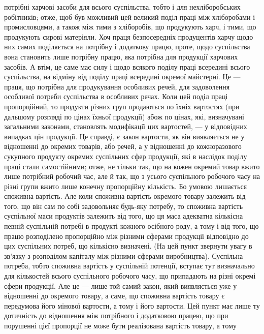 \parcont{}  %
потрібні харчові засоби для всього суспільства, тобто і для нехліборобських робітників;
отже, щоб був можливий цей великий поділ праці між хліборобами
і промисловцями, а також між тими з хліборобів, що продукують харч, і тими,
що продукують сирові матеріяли. Хоч праця безпосередніх продуцентів харчу
щодо них самих поділяється на потрібну і додаткову працю, проте, щодо
суспільства вона становить лише потрібну працю, яка потрібна для продукції
харчових засобів. А втім, це саме має силу і щодо всякого поділу праці
всередині всього суспільства, на відміну від поділу праці всередині окремої майстерні.
Це — праця, що потрібна для продукування особливих речей, для задоволення
особливої потреби суспільства в особливих речах. Коли цей поділ праці
пропорційний, то продукти різних груп продаються по їхніх вартостях (при
дальшому розгляді по цінах їхньої продукції) абож по цінах, які, визначувані
загальними законами, становлять модифікації цих вартостей, — у відповідних
випадках цін продукції. Це справді, є закон вартости, як він виявляється не
у відношенні до окремих товарів, або речей, а у відношенні до кожноразового
сукупного продукту окремих суспільних сфер продукції, які в наслідок поділу
праці стали самостійними; отже, не тільки так, що на кожен окремий товар вжито
лише потрібний робочий час, але й так, що з усього суспільного робочого часу
на різні групи вжито лише конечну пропорційну кількість. Бо умовою лишається
споживна вартість. Але коли споживна вартість окремого товару залежить
від того, що він сам по собі задовольняє будь-яку потребу, то споживна вартість
суспільної маси продуктів залежить від того, що ця маса адекватна кількісна
певній суспільній потребі в продукті кожного осібного роду, а тому і від того,
що працю розподілено пропорційно між різними сферами продукції відповідно
до цих суспільних потреб, що кількісно визначені. (На цей пункт звернути
увагу в зв’язку з розподілом капіталу між різними сферами виробництва). Суспільна
потреба, тобто споживна вартість у суспільній потенції, вступає тут визначально
для кількостей всього суспільного робочого часу, що припадають на
різні окремі сфери продукції. Але це — лише той самий закон, який виявляється
уже у відношенні до окремого товару, а саме, що споживна вартість товару
є передумова його мінової вартости, а тому і його вартости. Цей пункт має
лише ту дотичність до відношення між потрібного і додатковою працею, що при
порушенні цієї пропорції не може бути реалізована вартість товару, а тому
